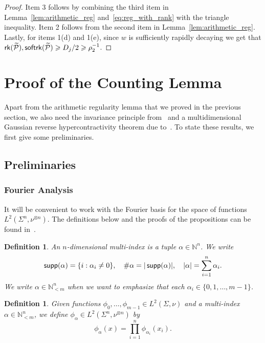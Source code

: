 \documentclass[11pt]{article}
\newtheorem{definition}[thm]{Definition}
\renewcommand\geq{\geqslant}
\newcommand{\V}[1]{{#1}}
\begin{document}
\begin{proof}
    Item 3 follows by combining the third item in Lemma~\ref{lem:arithmetic_reg} and~\eqref{eq:reg_with_rank} with the triangle inequality. Item 2 follows from the second item in Lemma~\ref{lem:arithmetic_reg}.
    Lastly, for items 1(d) and 1(e), since $w$ is sufficiently rapidly decaying we get that
    ${\sf rk}(\widetilde{\mathcal{P}}),{\sf softrk}(\widetilde{\mathcal{P}})\geq D_{j}/2\geq \rho_2^{-1}$.
\end{proof}

\section{Proof of the Counting Lemma}\label{sec:proof_of_main}


Apart from the arithmetic regularity lemma that we proved in the previous section, we also need the invariance principle from~\cite{Mossel} and a multidimensional Gaussian reverse hypercontractivity theorem due to~\cite{ChenDafnisPaouris2015HolderGaussian}. To state these results, we first give some preliminaries.

\subsection{Preliminaries}
\subsubsection{Fourier Analysis}
It will be convenient to work with the Fourier basis for the space of functions $L^2(\Sigma^n, \nu^{\otimes n})$. The definitions below and the proofs of the propositions can be found in~\cite{O14}.

\begin{definition}
	An $n$-dimensional \textit{multi-index} is a tuple $\alpha \in \mathbb{N}^n$. We write
	\[
	{\sf supp}(\alpha) = \{i : \alpha_i \neq 0\}, \quad \#\alpha = |\operatorname{\sf supp}(\alpha)|, \quad |\alpha| = \sum_{i=1}^{n} \alpha_i.
	\]
	We write $\alpha \in \mathbb{N}^n_{<m}$ when we want to emphasize that each $\alpha_i \in \{0,1,\dots,m-1\}$.
\end{definition}

\begin{definition}\label{def:fourier_basis}
	Given functions $\phi_0, \dots, \phi_{m-1} \in L^2(\Sigma, \nu)$ and a multi-index $\alpha \in \mathbb{N}^n_{<m}$, we define $\phi_{\alpha} \in L^2(\Sigma^n, \nu^{\otimes n})$ by
	\[
	\phi_{\alpha}(\V x) = \prod_{i=1}^{n} \phi_{\alpha_i}(x_i).
	\]
\end{definition}
\end{document}
